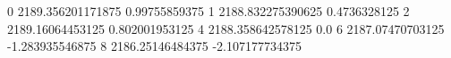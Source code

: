0 2189.356201171875 0.99755859375
1 2188.832275390625 0.4736328125
2 2189.16064453125 0.802001953125
4 2188.358642578125 0.0
6 2187.07470703125 -1.283935546875
8 2186.25146484375 -2.107177734375
